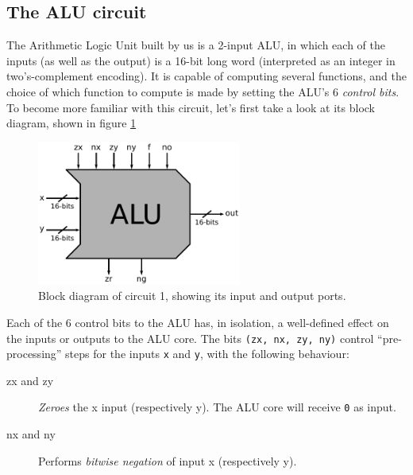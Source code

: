 \documentclass[a4paper]{article}
\begin{document}
        \subsection{The ALU circuit}
        \label{subsec:circuit-alu}
            The Arithmetic Logic Unit built by us is a 2-input ALU, in which each of the inputs (as
            well as the output) is a 16-bit long word (interpreted as an integer in two's-complement
            encoding). It is capable of computing several functions, and the choice of which
            function to compute is made by setting the ALU's 6 \emph{control bits}. To become more
            familiar with this circuit, let's first take a look at its block diagram, shown in
            figure \ref{fig:alu-block}
            \begin{figure}[h]
                \begin{center}
                    \includegraphics[width=0.6\textwidth]{imgs/alu-block.pdf}
                \end{center}
                \caption{Block diagram of circuit 1, showing its input and output ports.
                    \label{fig:alu-block}}
            \end{figure}

            Each of the 6 control bits to the ALU has, in isolation, a well-defined effect on the
            inputs or outputs to the ALU core. The bits \texttt{(zx, nx, zy, ny)} control
            ``pre-processing'' steps for the inputs \texttt{x} and \texttt{y}, with the following
            behaviour:
            \begin{description}
                \item[zx and zy] \emph{Zeroes} the x input (respectively y). The ALU core will
                    receive \texttt{0} as input.
                \item[nx and ny] Performs \emph{bitwise negation} of input x (respectively y).
            \end{description}
\end{document}

